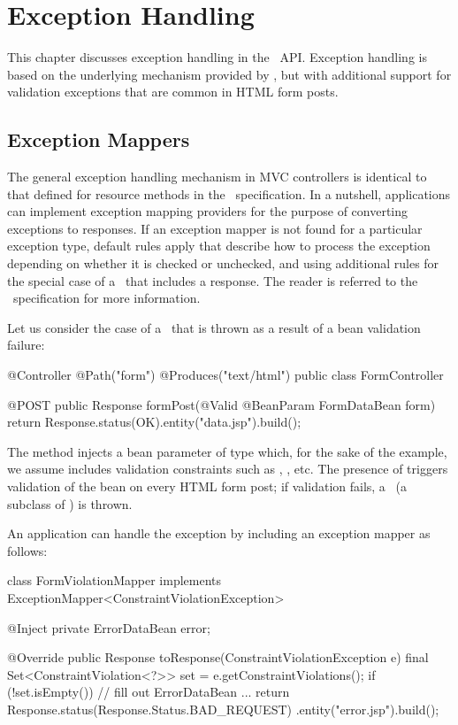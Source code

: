 \chapter{Exception Handling}
\label{exception_handling}

This chapter discusses exception handling in the \mvc\ API. Exception handling is based
on the underlying mechanism provided by \jaxrs, but with additional support for 
validation exceptions that are common in HTML form posts.

\section{Exception Mappers}
\label{exception_mappers}

The general exception handling mechanism in MVC controllers is identical to that defined
for resource methods in the \jaxrs\ specification. In a nutshell, applications can 
implement exception mapping providers for the purpose of converting exceptions to 
responses. If an exception mapper is not found for a particular exception type, 
default rules apply that describe how to process the exception depending on whether
it is checked or unchecked, and using additional rules for
the special case of a \WebAppExc\ that includes a response. The reader is referred
to the \jaxrs\ specification for more information.

Let us consider the case of a \ConstVioExc\ that is thrown as a result of a bean validation
failure:

\begin{listing}{1}
@Controller
@Path("form")
@Produces("text/html")
public class FormController {

    @POST
    public Response formPost(@Valid @BeanParam FormDataBean form) {
        return Response.status(OK).entity("data.jsp").build();    
    }
}
\end{listing}

The method  injects a bean parameter of type 
which, for the sake of the example, we assume includes validation constraints
such as , , etc. The presence of  triggers
validation of the bean on every HTML form post; if validation fails, a 
\ConstVioExc\ (a subclass of \ValExc) is thrown. 

An application can handle the exception by including an exception mapper as follows:

\begin{listing}{1}
class FormViolationMapper implements 
                          ExceptionMapper<ConstraintViolationException> {

    @Inject
    private ErrorDataBean error;

    @Override
    public Response toResponse(ConstraintViolationException e) {
        final Set<ConstraintViolation<?>> set = e.getConstraintViolations();
        if (!set.isEmpty()) {
            // fill out ErrorDataBean ...
        }
        return Response.status(Response.Status.BAD_REQUEST)
                       .entity("error.jsp").build();
    }
}
\end{listing}

